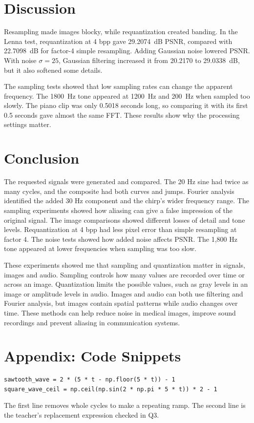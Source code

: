 \documentclass[11pt,a4paper]{article}
\begin{document}
\section{Discussion}
Resampling made images blocky, while requantization created banding. In the Lenna test, requantization at 4 bpp gave 29.2074~dB PSNR, compared with 22.7098~dB for factor-4 simple resampling. Adding Gaussian noise lowered PSNR. With noise \(\sigma = 25\), Gaussian filtering increased it from 20.2170 to 29.0338~dB, but it also softened some details.

The sampling tests showed that low sampling rates can change the apparent frequency. The 1800~Hz tone appeared at 1200~Hz and 200~Hz when sampled too slowly. The piano clip was only 0.5018 seconds long, so comparing it with its first 0.5 seconds gave almost the same FFT. These results show why the processing settings matter.

\section{Conclusion}
The requested signals were generated and compared.
The 20 Hz sine had twice as many cycles, and the composite had both curves and jumps.
Fourier analysis identified the added 30 Hz component and the chirp's wider frequency range.
The sampling experiments showed how aliasing can give a false impression of the original signal.
The image comparisons showed different losses of detail and tone levels.
Requantization at 4 bpp had less pixel error than simple resampling at factor 4.
The noise tests showed how added noise affects PSNR.
The 1,800 Hz tone appeared at lower frequencies when sampling was too slow.

These experiments showed me that sampling and quantization matter in signals, images and audio. Sampling controls how many values are recorded over time or across an image. Quantization limits the possible values, such as gray levels in an image or amplitude levels in audio. Images and audio can both use filtering and Fourier analysis, but images contain spatial patterns while audio changes over time. These methods can help reduce noise in medical images, improve sound recordings and prevent aliasing in communication systems.

\section*{Appendix: Code Snippets}
\begin{verbatim}
sawtooth_wave = 2 * (5 * t - np.floor(5 * t)) - 1
square_wave_ceil = np.ceil(np.sin(2 * np.pi * 5 * t)) * 2 - 1
\end{verbatim}
The first line removes whole cycles to make a repeating ramp.
The second line is the teacher's replacement expression checked in Q3.
\end{document}
